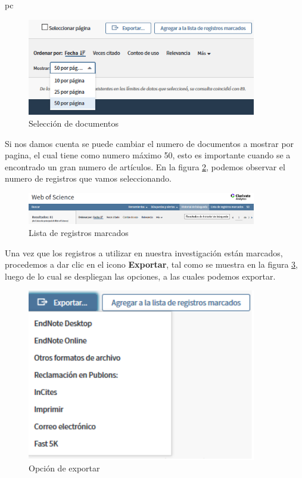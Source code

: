 pc\documentclass[a4paper,12pt,openany]{book}
\begin{document}
\begin{itemize}
    \begin{figure}[H]
    \centering
	\includegraphics[width=10cm]{Wos9.png}
    \caption{Selección de documentos}
    \label{fig:WOS9}
    \end{figure}

Si nos damos cuenta se puede cambiar el numero de documentos a mostrar por pagina, el cual tiene como numero máximo 50, esto es importante cuando se a encontrado un gran numero de artículos. En la figura \ref{fig:WOS10}, podemos observar el numero de registros que vamos seleccionando.


    \begin{figure}[H]
    \centering
	\includegraphics[width=10cm]{Wos10.png}
    \caption{Lista de registros marcados}
    \label{fig:WOS10}
    \end{figure}

Una vez que los registros a utilizar en nuestra investigación están marcados, procedemos a dar clic en el icono \textbf{Exportar}, tal como se muestra en la figura \ref{fig:WOS11}, luego de lo cual se despliegan las opciones, a las cuales podemos exportar. 

    \begin{figure}[H]
    \centering
	\includegraphics[width=10cm]{Wos11.png}
    \caption{Opción de exportar}
    \label{fig:WOS11}
    \end{figure}


\end{itemize}
\end{document}
